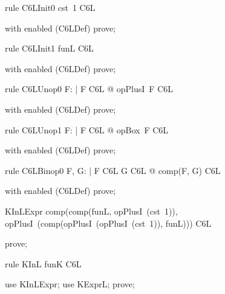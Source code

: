 \documentclass{article}
\begin{document}
\begin{theorem}{rule C6LInit0}
  cst~1 \in C6L
\end{theorem}

\begin{zproof}
with enabled (C6LDef) prove;
\end{zproof}

\begin{theorem}{rule C6LInit1}
  funL \in C6L
\end{theorem}

\begin{zproof}
with enabled (C6LDef) prove;
\end{zproof}

\begin{theorem}{rule C6LUnop0}
  \forall F: \nat \fun \nat | F \in C6L @ opPlusI~F \in C6L
\end{theorem}

\begin{zproof}
with enabled (C6LDef) prove;
\end{zproof}

\begin{theorem}{rule C6LUnop1}
  \forall F: \nat \fun \nat | F \in C6L @ opBox~F \in C6L
\end{theorem}

\begin{zproof}
with enabled (C6LDef) prove;
\end{zproof}

\begin{theorem}{rule C6LBinop0}
  \forall F, G: \nat \fun \nat | F \in C6L \land G \in C6L @ comp(F, G) \in C6L
\end{theorem}

\begin{zproof}
with enabled (C6LDef) prove;
\end{zproof}

\begin{theorem}{KInLExpr}
  comp(comp(funL, opPlusI~(cst~1)), opPlusI~(comp(opPlusI~(opPlusI~(cst~1)), funL))) \in C6L
\end{theorem}

\begin{zproof}
prove;
\end{zproof}

\begin{theorem}{rule KInL}
  funK \in C6L
\end{theorem}

\begin{zproof}
use KInLExpr;
use KExprL;
prove;
\end{zproof}
\end{document}
